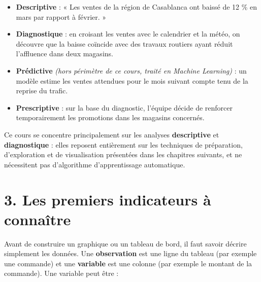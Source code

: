 \documentclass[
  french,
  letterpaper,
  open=any]{scrbook}
\providecommand{\tightlist}{%
  \setlength{\itemsep}{0pt}\setlength{\parskip}{0pt}}
\theoremstyle{definition}
\theoremstyle{definition}
\theoremstyle{remark}
\begin{document}
\begin{tcolorbox}[enhanced jigsaw, arc=.35mm, bottomrule=.15mm, bottomtitle=1mm, breakable, colback=white, colbacktitle=quarto-callout-tip-color!10!white, colframe=quarto-callout-tip-color-frame, coltitle=black, left=2mm, leftrule=.75mm, opacityback=0, opacitybacktitle=0.6, rightrule=.15mm, title=\textcolor{quarto-callout-tip-color}{\faLightbulb}\hspace{0.5em}{Exemple filé : une chaîne de supermarchés marocaine}, titlerule=0mm, toprule=.15mm, toptitle=1mm]

\begin{itemize}
\tightlist
\item
  \textbf{Descriptive} : « Les ventes de la région de Casablanca ont
  baissé de 12 \% en mars par rapport à février. »
\item
  \textbf{Diagnostique} : en croisant les ventes avec le calendrier et
  la météo, on découvre que la baisse coïncide avec des travaux routiers
  ayant réduit l'affluence dans deux magasins.
\item
  \textbf{Prédictive} \emph{(hors périmètre de ce cours, traité en
  Machine Learning)} : un modèle estime les ventes attendues pour le
  mois suivant compte tenu de la reprise du trafic.
\item
  \textbf{Prescriptive} : sur la base du diagnostic, l'équipe décide de
  renforcer temporairement les promotions dans les magasins concernés.
\end{itemize}

\end{tcolorbox}

Ce cours se concentre principalement sur les analyses
\textbf{descriptive} et \textbf{diagnostique} : elles reposent
entièrement sur les techniques de préparation, d'exploration et de
visualisation présentées dans les chapitres suivants, et ne nécessitent
pas d'algorithme d'apprentissage automatique.

\section{3. Les premiers indicateurs à
connaître}\label{les-premiers-indicateurs-uxe0-connauxeetre}

Avant de construire un graphique ou un tableau de bord, il faut savoir
décrire simplement les données. Une \textbf{observation} est une ligne
du tableau (par exemple une commande) et une \textbf{variable} est une
colonne (par exemple le montant de la commande). Une variable peut être
:
\end{document}
